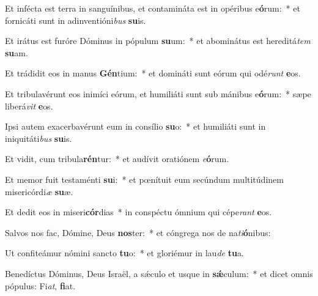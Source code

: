\item Et infécta est terra in sanguínibus, et contamináta est in opéribus e\textbf{ó}rum:~* et fornicáti sunt in adinventióni\textit{bus} \textbf{su}is.
\item Et irátus est furóre Dóminus in pópulum \textbf{su}um:~* et abominátus est hereditá\textit{tem} \textbf{su}am.
\item Et trádidit eos in manus \textbf{Gén}tium:~* et domináti sunt eórum qui odé\textit{runt} \textbf{e}os.
\item Et tribulavérunt eos inimíci eórum, et humiliáti sunt sub mánibus e\textbf{ó}rum:~* sæpe liberá\textit{vit} \textbf{e}os.
\item Ipsi autem exacerbavérunt eum in consílio \textbf{su}o:~* et humiliáti sunt in iniquitáti\textit{bus} \textbf{su}is.
\item Et vidit, cum tribula\textbf{rén}tur:~* et audívit oratiónem \textit{e}\textbf{ó}rum.
\item Et memor fuit testaménti \textbf{su}i:~* et pœnítuit eum secúndum multitúdinem misericórdi\textit{æ} \textbf{su}æ.
\item Et dedit eos in miseri\textbf{cór}dias~* in conspéctu ómnium qui cépe\textit{rant} \textbf{e}os.
\item Salvos nos fac, Dómine, Deus \textbf{nos}ter:~* et cóngrega nos de na\textit{ti}\textbf{ó}nibus:
\item Ut confiteámur nómini sancto \textbf{tu}o:~* et gloriémur in lau\textit{de} \textbf{tu}a.
\item Benedíctus Dóminus, Deus Israël, a sǽculo et usque in \textbf{sǽ}culum:~* et dicet omnis pópulus: Fi\textit{at}, \textbf{fi}at.
